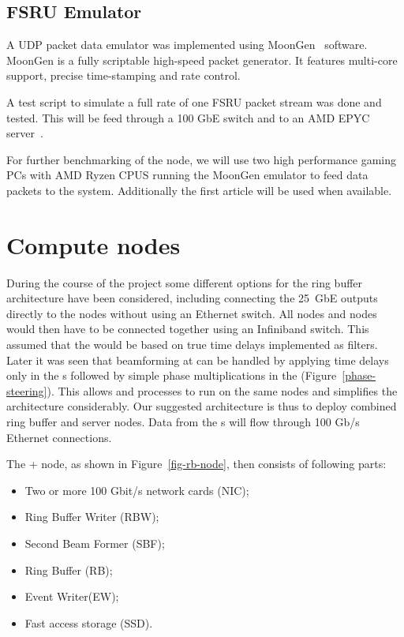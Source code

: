 \documentclass[12pt,a4paper]{article}
\begin{document}
\subsection{FSRU Emulator}
A UDP packet data emulator was implemented using MoonGen~\cite{moon-gen} software. 
MoonGen is a fully scriptable high-speed packet generator. It features multi-core support, precise time-stamping and rate control. 

A test script to simulate a full rate of one FSRU packet stream was done and tested. This will be feed through a 100 GbE switch and to an AMD EPYC server~\cite{amd-epyc}. 

For further benchmarking of the \SBF{} node, we will use two high performance gaming PCs with AMD Ryzen CPUS running the MoonGen emulator to feed data packets to the system. Additionally the \fsru{} first article will be used when available.

\section{Compute nodes}


During the course of the project some different options for the ring buffer architecture have been considered, including
connecting the \fsru{} 25~GbE outputs directly to the \RB nodes without using an Ethernet switch. 
All \RB{} nodes and \SBF{} nodes would then have to be connected together using an Infiniband switch.  This assumed that the \SBF{} would be based on true time delays implemented as \FIR{} filters. Later it was seen that beamforming at \NBW{} can be handled by applying time delays only in the \fsru{}s followed by simple phase multiplications in the \SBF{} (Figure~\ref{phase-steering}). This allows \RB and \SBF processes to run on the same nodes and simplifies the architecture considerably. Our suggested architecture is thus to deploy combined ring buffer and \SBF{} server nodes.  Data from the \fsru{}s will flow through 100 Gb/s Ethernet connections.

The \RB + \SBF node, as shown in Figure~\ref{fig-rb-node}, then consists of following parts:
\begin{itemize}
\item Two or more 100 Gbit/s network cards (NIC);
\item Ring Buffer Writer (RBW);
\item Second Beam Former  (SBF);
\item Ring Buffer (RB);
\item Event Writer(EW);
\item Fast access storage (SSD).
\end{itemize}
\end{document}
